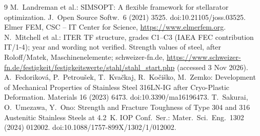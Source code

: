 \documentclass[10pt,a4paper]{article}
\begin{document}
\begin{thebibliography}{9}\small
{} M.~Landreman et al.: SIMSOPT: A flexible framework for stellarator optimization. J.\ Open Source
  Softw.\ 6 (2021) 3525. doi:10.21105/joss.03525.
 Elmer FEM, CSC -- IT Center for Science, \url{https://www.elmerfem.org}.
 N.~Mitchell et al.: ITER TF structure, grades C1--C3 (IAEA FEC contribution IT/1-4); year and
  wording not verified.
 Strength values of steel, after Roloff/Matek, Maschinenelemente; schweizer-fn.de,
  \url{https://www.schweizer-fn.de/festigkeit/festigkeitswerte/stahl/stahl_start.php} (accessed 3 Nov 2026).
 A.~Fedoriková, P.~Petroušek, T.~Kvačkaj, R.~Kočiško, M.~Zemko: Development of Mechanical
  Properties of Stainless Steel 316LN-IG after Cryo-Plastic Deformation. Materials 16 (2023) 6473.
  doi:10.3390/ma16196473.
 T.~Sakurai, O.~Umezawa, Y.~Ono: Strength and Fracture Toughness of Type 304 and 316 Austenitic
  Stainless Steels at 4.2~K. IOP Conf.\ Ser.: Mater.\ Sci.\ Eng.\ 1302 (2024) 012002.
  doi:10.1088/1757-899X/1302/1/012002.
\end{thebibliography}
\end{document}
